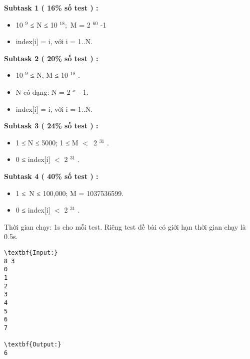 \textbf{Subtask 1 ( 16\% số test ) : }
\begin{itemize}
	\item 

10 $^ 9 $ ≤ N ≤ 10 $^ 18; $ M = 2 $^ 60 $ -1
	\item 

index[i] = i, với i = 1..N.
\end{itemize}

\textbf{Subtask 2 ( 20\% số test ) : }
\begin{itemize}
	\item 

10 $^ 9 $ ≤ N, M ≤ 10 $^ 18 $ .
	\item 

N có dạng: N = 2 $^ x $ - 1.
	\item 

index[i] = i, với i = 1..N.
\end{itemize}

\textbf{Subtask 3 ( 24\% số test ) : }
\begin{itemize}
	\item 

1 ≤ N ≤ 5000; 1 ≤ M $<$ 2 $^ 31 $ .
	\item 

0 ≤ index[i] $<$ 2 $^ 31 $ .
\end{itemize}

\textbf{Subtask 4 ( 40\% số test ) : }
\begin{itemize}
	\item 

1 ≤ N ≤ 100,000; M = 1037536599.
	\item 

0 ≤ index[i] $<$ 2 $^ 31 $ .
\end{itemize}

Thời gian chạy: 1s cho mỗi test. Riêng test đề bài có giới hạn thời gian chạy là 0.5s.
\begin{verbatim}
\textbf{Input:}
8 3
0
1
2
3
4
5
6
7

\textbf{Output:}
6
\end{verbatim}
